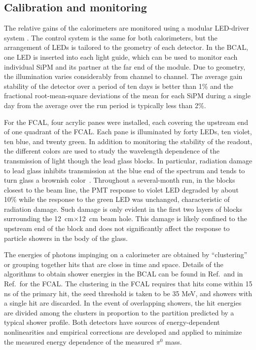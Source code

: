 \subsection[Calibration and monitoring]{Calibration and monitoring \label{sec:calcalib}}
The relative gains of the calorimeters are monitored using a modular LED-driver system \cite{Anassontzis201441}. The control system is the same for both calorimeters, but the arrangement of LEDs is tailored to the geometry of each detector. In the BCAL, one LED is inserted into each light guide, which can be used to monitor each individual SiPM and its partner at the far end of the module.
Due to geometry, the illumination varies considerably from channel to channel. 
The average gain stability of the detector over a period of ten days is better than 1\% and the fractional root-mean-square deviations of the mean for each SiPM during a single day from the average over the run period is typically less than 2\%.

For the FCAL, four acrylic panes were installed, each covering the upstream end of one quadrant of the FCAL. Each pane is illuminated by forty LEDs, ten violet, ten blue, and twenty green. In addition to monitoring the stability of the readout, the different colors are used to study the wavelength dependence of the transmission of light though the lead glass blocks.  In particular, radiation damage to lead glass inhibits transmission at the blue end of the spectrum and tends to turn glass a brownish color~\cite{Schaefer:2011gw}.  Throughout a several-month run, in the blocks closest to the beam line, the PMT response to violet LED degraded by about 10\% while the response to the green LED was unchanged, characteristic of radiation damage.  Such damage is only evident in the first two layers of blocks surrounding the 12~cm$\times$12~cm beam hole. This damage is likely confined to the upstream end of the block and does not significantly affect the response to particle showers in the body of the glass.

The energies of photons impinging on a calorimeter are obtained by ``clustering'' or grouping together hits that are close in time and space. Details of the algorithms to obtain shower energies in the BCAL can be found in Ref.\,\cite{BEATTIE201824}  and in Ref.\,\cite{Jones:2006ru} for the FCAL. The clustering in the FCAL requires that hits come within 15 ns of the primary hit, the seed threshold is taken to be 35 MeV, and showers with a single hit are discarded. In the event of overlapping showers, the hit energies are divided among the clusters in proportion to the partition predicted by a typical shower profile. Both detectors have sources of energy-dependent nonlinearities and empirical corrections are developed and applied to minimize the measured energy dependence of the measured $\pi^0$ mass.  


